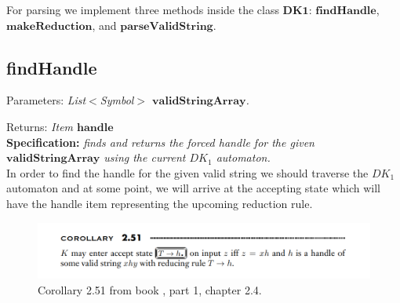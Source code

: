 For parsing we implement three methods inside the class \(\boldsymbol{DK1}\):  \(\boldsymbol{findHandle}\), \(\boldsymbol{makeReduction}\), and \(\boldsymbol{parseValidString}\).

\vspace{10pt}

\subsection{findHandle}

Parameters: \textit{List\(<\)Symbol\(>\) \(\boldsymbol{validStringArray}\).}

Returns: \textit{Item \(\boldsymbol{handle}\)}\\

\textbf{Specification:} \textit{finds and returns the forced handle for the given \(\boldsymbol{validStringArray}\) using the current \(DK_{1}\) automaton.}\\

In order to find the handle for the given valid string we should traverse the \(DK_{1}\) automaton and at some point, we will arrive at the accepting state which will have the handle item representing the upcoming reduction rule.

\begin{figure}[h!]
    \includegraphics[width=\linewidth]{Identify Handle.png}
    \caption{Corollary 2.51 from book \cite{sipser}, part 1, chapter 2.4.}
    \label{figure 5}
\end{figure}

\vspace{10pt}

